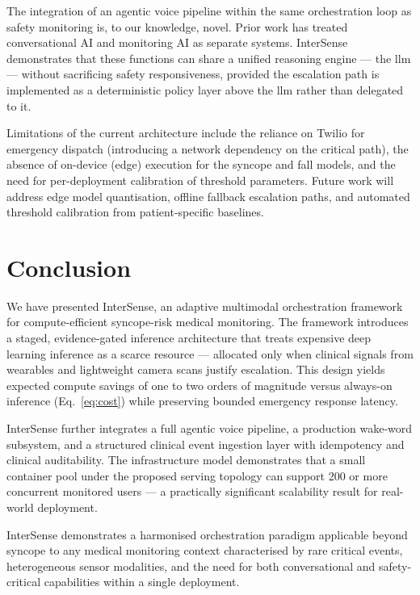 \documentclass[10pt,twocolumn,a4paper]{article}
\begin{document}
The integration of an agentic voice pipeline within the same
orchestration loop as safety monitoring is, to our knowledge, novel.
Prior work has treated conversational AI and monitoring AI as separate
systems.  InterSense demonstrates that these functions can share a
unified reasoning engine — the \gls{llm} — without sacrificing safety
responsiveness, provided the escalation path is implemented as a
deterministic policy layer above the \gls{llm} rather than delegated
to it.

Limitations of the current architecture include the reliance on Twilio
for emergency dispatch (introducing a network dependency on the
critical path), the absence of on-device (edge) execution for the
syncope and fall models, and the need for per-deployment calibration of
threshold parameters.  Future work will address edge model
quantisation, offline fallback escalation paths, and automated
threshold calibration from patient-specific baselines.

\section{Conclusion}

We have presented InterSense, an adaptive multimodal orchestration
framework for compute-efficient syncope-risk medical monitoring.  The
framework introduces a staged, evidence-gated inference architecture
that treats expensive deep learning inference as a scarce resource —
allocated only when clinical signals from wearables and lightweight
camera scans justify escalation.  This design yields expected compute
savings of one to two orders of magnitude versus always-on inference
(Eq.~\ref{eq:cost}) while preserving bounded emergency response
latency.

InterSense further integrates a full agentic voice pipeline, a
production wake-word subsystem, and a structured clinical event
ingestion layer with idempotency and clinical auditability.  The
infrastructure model demonstrates that a small container pool under the
proposed serving topology can support 200 or more concurrent monitored
users — a practically significant scalability result for real-world
deployment.

InterSense demonstrates a harmonised orchestration paradigm applicable
beyond syncope to any medical monitoring context characterised by rare
critical events, heterogeneous sensor modalities, and the need for both
conversational and safety-critical capabilities within a single
deployment.
\end{document}
